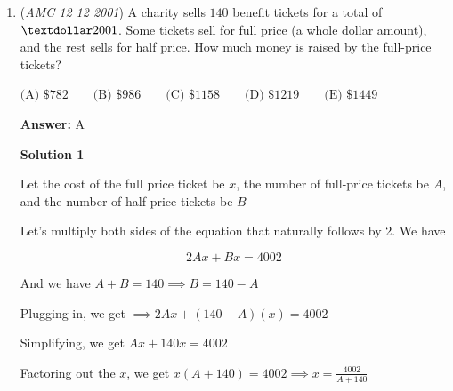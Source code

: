 \begin{enumerate}
 We note that $1$, $3$, $5$, $7$, $9$ are the odd numbers, and possible sequences for $GHIJ$ are either $1$, $3$, $5$, $7$ or $3$, $5$, $7$, $9$.

 $3$, $5$, and $7$ are included in both possible sequences so that we can rule out the possibilities of $3$, $5$, and $7$ for $A$, so $A$ can only be $4$, $6$, or $8$ (Note that we can also rule out $9$ as a possibility since there is no set of $2$ unique digits that could sum with $9$ to $9$). Since every possible sequence of $DEF$ also contains $4$, we can rule out $4$ as well.

 Testing $A$=$6$ means $D$, $E$, $F$ is $0$, $2$, $4$, respectively. However, $6$ and $8$ must then be part of $ABC$, and they already sum to more than $9$. So then we can try $A$=$8$. We have two cases: Where $DEF$ includes $0$, $2$, and $4$, or when $DEF$ includes $2$, $4$, and $6$. If we say the former, $ABC$ includes $6$ as well as $8$, which, again, has a sum over $9$. Therefore, $DEF$ must include $2$, $4$, and $6$, and leaves us with $0$, $1$, and $8$ for $ABC$. This sums to 9, and since the largest digit is $8$, $\boxed{\textbf{(E)}\ 8}$ is our answer.

 


	\item (\textit{AMC 12 12 2001}) A charity sells $140$ benefit tickets for a total of $\textdollar 2001$. Some tickets sell for full price (a whole dollar amount), and the rest sells for half price. How much money is raised by the full-price tickets?


 $\text{(A) }\$782\qquad \text{(B) }\$986\qquad \text{(C) }\$1158\qquad \text{(D) }\$1219\qquad \text{(E) }\$1449$

 \textbf{Answer: }A



\textbf{Solution 1}

Let the cost of the full price ticket be $x$, the number of full-price tickets be $A$, and the number of half-price tickets be $B$

 Let's multiply both sides of the equation that naturally follows by 2. We have

 
 \[2Ax+Bx=4002\]

 And we have $A+B=140\implies B=140-A$

 Plugging in, we get $\implies 2Ax+(140-A)(x)=4002$

 Simplifying, we get $Ax+140x=4002$

 Factoring out the $x$, we get $x(A+140)=4002\implies x=\frac{4002}{A+140}$


\end{enumerate}
